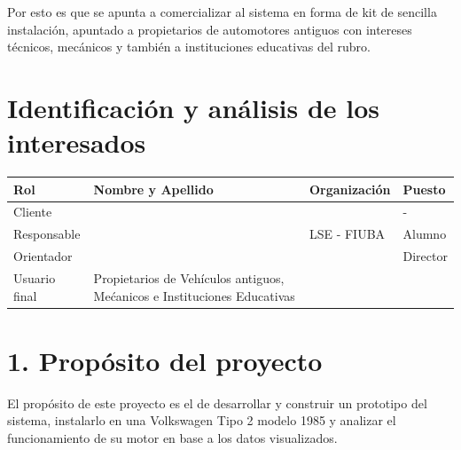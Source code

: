 \documentclass[11pt]{charter}
\begin{document}
Por esto es que se apunta a comercializar al sistema en forma de kit de sencilla instalación, apuntado a propietarios de automotores antiguos con intereses técnicos, mecánicos y también a instituciones educativas del rubro.

\section{Identificación y análisis de los interesados}
\label{sec:interesados}

\begin{table}[ht]
\begin{tabularx}{\linewidth}{@{}|l|X|X|l|@{}}
\hline
\rowcolor[HTML]{C0C0C0} 
Rol           & Nombre y Apellido & Organización 	& Puesto 	\\ \hline
Cliente       & \clientename      						&\empclientename	& -      	\\ \hline
Responsable   & \authorname       						& LSE - FIUBA  		& Alumno 	\\ \hline
Orientador    & \supname	      						& \pertesupname 	& Director \\ \hline
Usuario final & Propietarios de Vehículos antiguos, \newline  
				Mećanicos e Instituciones Educativas \newline  &            & \\ \hline
\end{tabularx}
\end{table}

\section{1. Propósito del proyecto}
\label{sec:proposito}

El propósito de este proyecto es el de desarrollar y construir un prototipo del sistema, instalarlo en una Volkswagen Tipo 2 modelo 1985 y analizar el funcionamiento de su motor en base a los datos visualizados.
\end{document}
